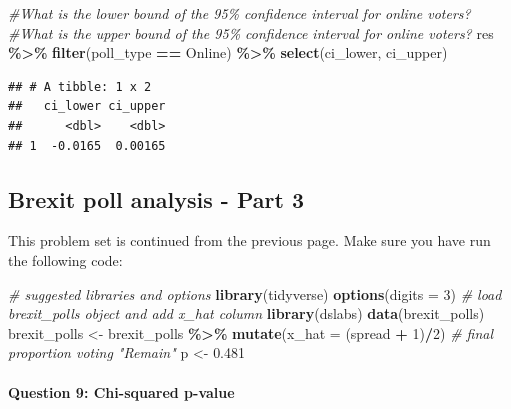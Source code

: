\documentclass[
]{article}
\newenvironment{Shaded}{\begin{snugshade}}{\end{snugshade}}
\newcommand{\CommentTok}[1]{\textcolor[rgb]{0.56,0.35,0.01}{\textit{#1}}}
\newcommand{\DataTypeTok}[1]{\textcolor[rgb]{0.13,0.29,0.53}{#1}}
\newcommand{\DecValTok}[1]{\textcolor[rgb]{0.00,0.00,0.81}{#1}}
\newcommand{\FloatTok}[1]{\textcolor[rgb]{0.00,0.00,0.81}{#1}}
\newcommand{\KeywordTok}[1]{\textcolor[rgb]{0.13,0.29,0.53}{\textbf{#1}}}
\newcommand{\NormalTok}[1]{#1}
\newcommand{\OperatorTok}[1]{\textcolor[rgb]{0.81,0.36,0.00}{\textbf{#1}}}
\newcommand{\StringTok}[1]{\textcolor[rgb]{0.31,0.60,0.02}{#1}}
\begin{document}
\begin{Shaded}
\begin{Highlighting}[]
\CommentTok{\#What is the lower bound of the 95\% confidence interval for online voters?}
\CommentTok{\#What is the upper bound of the 95\% confidence interval for online voters?}
\NormalTok{res }\OperatorTok{\%\textgreater{}\%}
\StringTok{  }\KeywordTok{filter}\NormalTok{(poll\_type }\OperatorTok{==}\StringTok{ \textquotesingle{}Online\textquotesingle{}}\NormalTok{) }\OperatorTok{\%\textgreater{}\%}
\StringTok{  }\KeywordTok{select}\NormalTok{(ci\_lower, ci\_upper)}
\end{Highlighting}
\end{Shaded}

\begin{verbatim}
## # A tibble: 1 x 2
##   ci_lower ci_upper
##      <dbl>    <dbl>
## 1  -0.0165  0.00165
\end{verbatim}

\hypertarget{brexit-poll-analysis---part-3}{%
\subsection{Brexit poll analysis - Part
3}\label{brexit-poll-analysis---part-3}}

This problem set is continued from the previous page. Make sure you have
run the following code:

\begin{Shaded}
\begin{Highlighting}[]
\CommentTok{\# suggested libraries and options}
\KeywordTok{library}\NormalTok{(tidyverse)}
\KeywordTok{options}\NormalTok{(}\DataTypeTok{digits =} \DecValTok{3}\NormalTok{)}
\CommentTok{\# load brexit\_polls object and add x\_hat column}
\KeywordTok{library}\NormalTok{(dslabs)}
\KeywordTok{data}\NormalTok{(brexit\_polls)}
\NormalTok{brexit\_polls \textless{}{-}}\StringTok{ }\NormalTok{brexit\_polls }\OperatorTok{\%\textgreater{}\%}
\StringTok{    }\KeywordTok{mutate}\NormalTok{(}\DataTypeTok{x\_hat =}\NormalTok{ (spread }\OperatorTok{+}\StringTok{ }\DecValTok{1}\NormalTok{)}\OperatorTok{/}\DecValTok{2}\NormalTok{)}
\CommentTok{\# final proportion voting "Remain"}
\NormalTok{p \textless{}{-}}\StringTok{ }\FloatTok{0.481}
\end{Highlighting}
\end{Shaded}

\hypertarget{question-9-chi-squared-p-value}{%
\paragraph{Question 9: Chi-squared
p-value}\label{question-9-chi-squared-p-value}}
\end{document}
